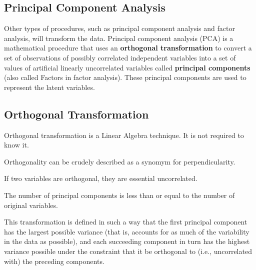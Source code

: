 \subsection{Principal Component Analysis}
Other types of procedures, such as principal component analysis and factor analysis, will transform the data.
Principal component analysis (PCA) is a mathematical procedure that uses an \textbf{orthogonal transformation} to convert a set of observations of possibly correlated independent variables into a set of values of artificial linearly uncorrelated variables called \textbf{principal components} (also called Factors in factor analysis). These principal components are used to represent the latent variables.

\subsection{Orthogonal Transformation}
Orthogonal transformation is a Linear Algebra technique. It is not required to know it. 

Orthogonality can be crudely described as a synomym for perpendicularity. 

If two variables are orthogonal, they are essential uncorrelated.

The number of principal components is less than or equal to the number of original variables. 

This transformation is defined in such a way that the first principal component has the largest 
possible variance (that is, accounts for as much of the variability in the data as possible), and each 
succeeding component in turn has the highest variance possible under the constraint that it be orthogonal to (i.e., uncorrelated with) the preceding components.


